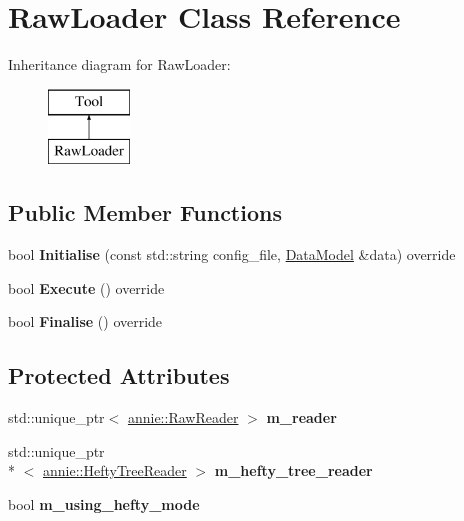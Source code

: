 \hypertarget{classRawLoader}{\section{Raw\-Loader Class Reference}
\label{classRawLoader}
}
Inheritance diagram for Raw\-Loader\-:\begin{figure}[H]
\begin{center}
\leavevmode
\includegraphics[height=2.000000cm]{classRawLoader}
\end{center}
\end{figure}
\subsection*{Public Member Functions}
\begin{DoxyCompactItemize}
\item 
\hypertarget{classRawLoader_ae1c05cc78031706983688968c8301980}{bool {\bfseries Initialise} (const std\-::string config\-\_\-file, \hyperlink{classDataModel}{Data\-Model} \&data) override}\label{classRawLoader_ae1c05cc78031706983688968c8301980}

\item 
\hypertarget{classRawLoader_a1b6104569dab1b8e48487eda0f3b3cb4}{bool {\bfseries Execute} () override}\label{classRawLoader_a1b6104569dab1b8e48487eda0f3b3cb4}

\item 
\hypertarget{classRawLoader_a2f7c4abad1a0b59b6cbd4f28ec31a1ec}{bool {\bfseries Finalise} () override}\label{classRawLoader_a2f7c4abad1a0b59b6cbd4f28ec31a1ec}

\end{DoxyCompactItemize}
\subsection*{Protected Attributes}
\begin{DoxyCompactItemize}
\item 
\hypertarget{classRawLoader_a71fd51944f2719b8106d5ed9763ae0bc}{std\-::unique\-\_\-ptr$<$ \hyperlink{classannie_1_1RawReader}{annie\-::\-Raw\-Reader} $>$ {\bfseries m\-\_\-reader}}\label{classRawLoader_a71fd51944f2719b8106d5ed9763ae0bc}

\item 
\hypertarget{classRawLoader_a675c51ad0d732caa1d42e60d780edef9}{std\-::unique\-\_\-ptr\\*
$<$ \hyperlink{classannie_1_1HeftyTreeReader}{annie\-::\-Hefty\-Tree\-Reader} $>$ {\bfseries m\-\_\-hefty\-\_\-tree\-\_\-reader}}\label{classRawLoader_a675c51ad0d732caa1d42e60d780edef9}

\item 
\hypertarget{classRawLoader_aa56f600a7138f78d2775f40136783df4}{bool {\bfseries m\-\_\-using\-\_\-hefty\-\_\-mode}}\label{classRawLoader_aa56f600a7138f78d2775f40136783df4}

\end{DoxyCompactItemize}


